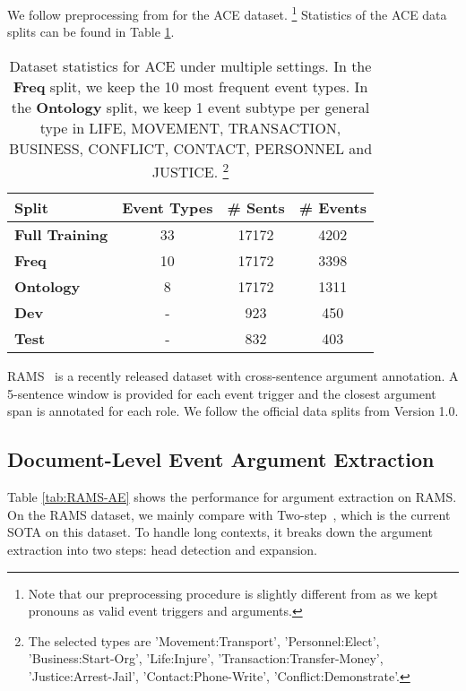 We follow preprocessing from \cite{Lin2020OneIE, Wadden2019EntityRA} for the \textsc{ACE} dataset.
\footnote{Note that our preprocessing procedure is slightly different from \cite{Du2020EventQA} as we kept pronouns as valid event triggers and arguments.}
Statistics of the \textsc{ACE} data splits can be found in Table \ref{tab:ace-stats}.
\begin{table}[]
    \centering
    \small 
    \begin{tabular}{l| c c c  }
    \toprule 
        Split & Event Types & \# Sents & \# Events \\
        \midrule 
        \textbf{Full Training} & 33  & 17172 & 4202  \\
        \textbf{Freq} & 10 & 17172 & 3398  \\
        \textbf{Ontology} & 8 & 17172 & 1311  \\
        \textbf{Dev} & - & 923 &   450  \\
        \textbf{Test} & - & 832 &   403  \\
        \bottomrule
    \end{tabular}
    \caption{Dataset statistics for \textsc{ACE} under multiple settings. In the \textbf{Freq} split, we keep the 10 most frequent event types. In the \textbf{Ontology} split, we keep 1 event subtype per general type in LIFE, MOVEMENT, TRANSACTION, BUSINESS, CONFLICT, CONTACT, PERSONNEL and JUSTICE. \footnote{The selected types are 'Movement:Transport', 'Personnel:Elect',
'Business:Start-Org', 'Life:Injure', 'Transaction:Transfer-Money',
'Justice:Arrest-Jail', 
'Contact:Phone-Write', 'Conflict:Demonstrate'.} }
    \label{tab:ace-stats}
\end{table}
\textsc{RAMS}~\cite{Ebner2020RAMS} is a recently released dataset with cross-sentence argument annotation. A 5-sentence window is provided for each event trigger and the closest argument span is annotated for each role. 
We follow the official data splits from Version 1.0.

    
\subsection{Document-Level Event Argument Extraction}
Table \ref{tab:RAMS-AE} shows the performance for argument extraction on \textsc{RAMS}. 
On the \textsc{RAMS} dataset, we mainly compare with Two-step~\cite{Zhang2020TwoStep}, which is the current SOTA on this dataset.  To handle long contexts, it breaks down the argument extraction into two steps: head detection and expansion.  

